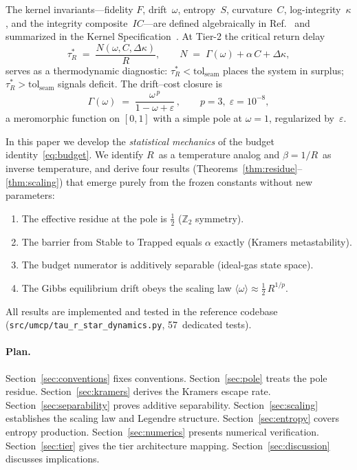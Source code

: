 \documentclass[
  aps,
  prd,
  twocolumn,
  showpacs,
  superscriptaddress,
  nofootinbib,
  floatfix
]{revtex4-2}
\newcommand{\tR}{\tau_{\!R}^{*}}
\newcommand{\Gam}{\Gamma}
\newcommand{\eps}{\varepsilon}
\newcommand{\tolseam}{\mathrm{tol}_{\mathrm{seam}}}
\newcommand{\beq}{\begin{equation}}
\newcommand{\eeq}{\end{equation}}
\begin{document}
The kernel invariants---fidelity $F$, drift~$\omega$, entropy~$S$,
curvature~$C$, log-integrity~$\kappa$, and the integrity
composite~$IC$---are defined algebraically in
Ref.~\cite{paulus2025physicscoherence}
and summarized in the Kernel Specification~\cite{umcpmetadatarepo}.
At Tier-2 the critical return delay
\beq\label{eq:budget}
  \tR \;=\; \frac{N(\omega,C,\Delta\kappa)}{R},
  \qquad
  N \;=\; \Gam(\omega) + \alpha\,C + \Delta\kappa,
\eeq
serves as a thermodynamic diagnostic: $\tR < \tolseam$ places the
system in surplus; $\tR > \tolseam$ signals deficit.
The drift--cost closure is
\beq\label{eq:gamma}
  \Gam(\omega) \;=\; \frac{\omega^{\,p}}{1-\omega+\eps}\,,
  \qquad p=3,\;\eps=10^{-8},
\eeq
a meromorphic function on $[0,1]$ with a simple pole at
$\omega=1$, regularized by~$\eps$.

In this paper we develop the \emph{statistical mechanics} of the
budget identity~\eqref{eq:budget}.  We identify $R$~as a temperature
analog and $\beta=1/R$~as inverse temperature, and derive four
results (Theorems~\ref{thm:residue}--\ref{thm:scaling}) that emerge
purely from the frozen constants without new parameters:
\begin{enumerate}
  \item The effective residue at the pole is $\tfrac{1}{2}$
        ($\mathbb{Z}_2$ symmetry).
  \item The barrier from Stable to Trapped equals $\alpha$ exactly
        (Kramers metastability).
  \item The budget numerator is additively separable (ideal-gas
        state space).
  \item The Gibbs equilibrium drift obeys the scaling law
        $\langle\omega\rangle\approx\tfrac{1}{2}\,R^{1/p}$.
\end{enumerate}
All results are implemented and tested in the reference codebase
(\texttt{src/umcp/tau\_r\_star\_dynamics.py}, 57~dedicated tests).

\paragraph{Plan.}
Section~\ref{sec:conventions} fixes conventions.
Section~\ref{sec:pole} treats the pole residue.
Section~\ref{sec:kramers} derives the Kramers escape rate.
Section~\ref{sec:separability} proves additive separability.
Section~\ref{sec:scaling} establishes the scaling law and
Legendre structure.
Section~\ref{sec:entropy} covers entropy production.
Section~\ref{sec:numerics} presents numerical verification.
Section~\ref{sec:tier} gives the tier architecture mapping.
Section~\ref{sec:discussion} discusses implications.
\end{document}
